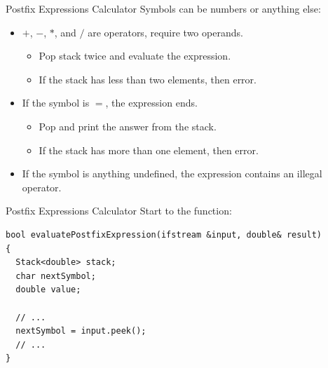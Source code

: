 \documentclass[14pt,aspectratio=1610]{beamer}
\begin{document}
\begin{frame}{Postfix Expressions Calculator}
Symbols can be numbers or anything else:
\begin{itemize}
  \item
    $+$, $-$, $*$, and $/$ are operators, require two operands.
  \begin{itemize}
    \item
      Pop stack twice and evaluate the expression.
    \item
      If the stack has less than two elements, then error.
  \end{itemize}
  \item
    If the symbol is $=$, the expression ends.
    \begin{itemize}
      \item
        Pop and print the answer from the stack.
      \item
        If the stack has more than one element, then error.
    \end{itemize}
  \item
    If the symbol is anything undefined, the expression contains an illegal operator.
\end{itemize}
\end{frame}

\begin{frame}[fragile]{Postfix Expressions Calculator}
Start to the function:
\begin{lstlisting}
bool evaluatePostfixExpression(ifstream &input, double& result)
{
  Stack<double> stack;
  char nextSymbol;
  double value;

  // ...
  nextSymbol = input.peek();
  // ...
}
\end{lstlisting}
\end{frame}


\end{document}
